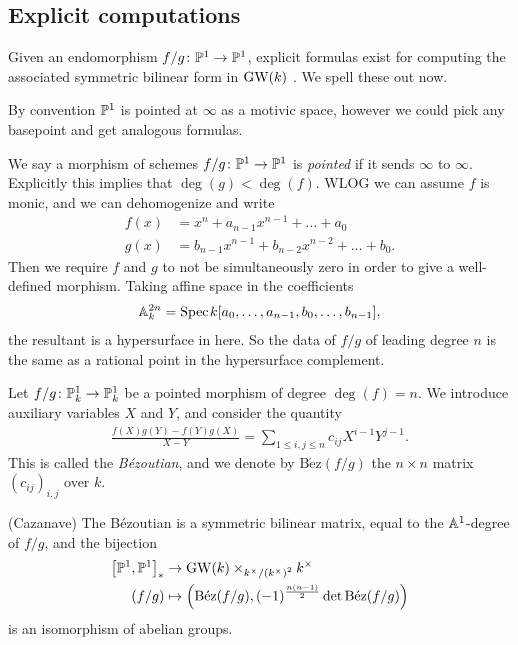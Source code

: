 \documentclass[11pt,openany]{book}
\providecommand{\Bez}{\mathrm{B\acute{e}z}}
\begin{document}
\subsection{Explicit computations}
Given an endomorphism $f/g \colon \P^1\to \P^1$, explicit formulas exist for computing the associated symmetric bilinear form in $\GW(k)$ \cite{Cazanave}. We spell these out now.

By convention $\P^1$ is pointed at $\infty$ as a motivic space, however we could pick any basepoint and get analogous formulas.

\begin{note} We say a morphism of schemes $f/g \colon \P^1 \to \P^1$ is \textit{pointed} if it sends $\infty$ to $\infty$. Explicitly this implies that $\deg(g) < \deg(f)$. WLOG we can assume $f$ is monic, and we can dehomogenize and write
\begin{align*}
    f(x) &= x^n + a_{n-1} x^{n-1} + \ldots + a_0 \\
    g(x) &= b_{n-1}x^{n-1} + b_{n-2}x^{n-2} + \ldots + b_0.
\end{align*}
Then we require $f$ and $g$ to not be simultaneously zero in order to give a well-defined morphism. Taking affine space in the coefficients
\begin{align*}
    \A_k^{2n} = \Spec k[a_0, \ldots, a_{n-1},b_0, \ldots, b_{n-1}],
\end{align*}
the resultant is a hypersurface in here. So the data of $f/g$ of leading degree $n$ is the same as a rational point in the hypersurface complement.
\end{note}


\begin{definition} Let $f/g \colon \P_k^1 \to \P_k^1$ be a pointed morphism of degree $\deg(f) = n$. We introduce auxiliary variables $X$ and $Y$, and consider the quantity
\begin{align*}
    \frac{f(X)g(Y) - f(Y)g(X)}{X-Y} = \sum_{1\le i,j\le n} c_{ij} X^{i-1}Y^{j-1}.
\end{align*}
This is called the \textit{B\'ezoutian}, and we denote by $\Bez(f/g)$ the $n \times n$ matrix $(c_{ij})_{i,j}$ over $k$.
\end{definition}

\begin{theorem} (Cazanave) The B\'{e}zoutian is a symmetric bilinear matrix, equal to the $\A^1$-degree of $f/g$, and the bijection
\begin{align*}
    \left[ \P^1,\P^1 \right]_\ast &\to \GW(k) \times_{k^\times / \left( k^\times \right)^2} k^\times \\
    (f/g) &\mapsto \left( \Bez(f/g), (-1)^{\frac{n(n-1)}{2}} \det \Bez(f/g) \right)
\end{align*}
is an isomorphism of abelian groups.
\end{theorem}
\end{document}
